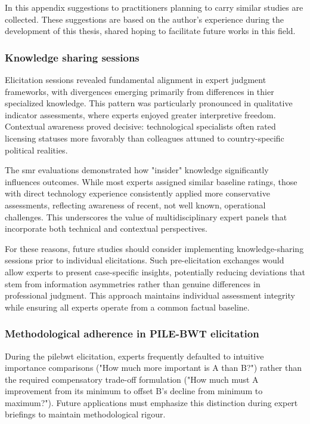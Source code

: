 \label{sec:appendix_suggestions}
In this appendix suggestions to practitioners planning to carry similar studies are collected. These suggestions are based on the author's experience during the development of this thesis, shared hoping to facilitate future works in this field.

\subsubsection{Knowledge sharing sessions}
Elicitation sessions revealed fundamental alignment in expert judgment frameworks, with divergences emerging primarily from differences in thier specialized knowledge. This pattern was particularly pronounced in qualitative indicator assessments, where experts enjoyed greater interpretive freedom. Contextual awareness proved decisive: technological specialists often rated licensing statuses more favorably than colleagues attuned to country-specific political realities.

The \gls{smr} evaluations demonstrated how "insider" knowledge significantly influences outcomes. While most experts assigned similar baseline ratings, those with direct technology experience consistently applied more conservative assessments, reflecting awareness of recent, not well known, operational challenges. This underscores the value of multidisciplinary expert panels that incorporate both technical and contextual perspectives.

For these reasons, future studies should consider implementing knowledge-sharing sessions prior to individual elicitations. Such pre-elicitation exchanges would allow experts to present case-specific insights, potentially reducing deviations that stem from information asymmetries rather than genuine differences in professional judgment. This approach maintains individual assessment integrity while ensuring all experts operate from a common factual baseline.

\subsubsection{Methodological adherence in PILE-BWT elicitation}
During the \gls{pilebwt} elicitation, experts frequently defaulted to intuitive importance comparisons ("How much more important is A than B?") rather than the required compensatory trade-off formulation ("How much must A improvement from its minimum to offset B's decline from minimum to maximum?"). Future applications must emphasize this distinction during expert briefings to maintain methodological rigour.

